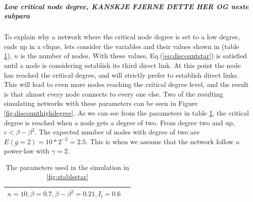 \subparagraph{Low critical node degree, KANSKJE FJERNE DETTE HER OG neste subpara}
To explain why a network where the critical node degree is set to a low degree, ends up in a clique, 
 lets consider the variables and their values shown in (table \ref{tbl:clique}), $n$ is the number of nodes. With these values, Eq.(\ref{eq:discountstar}) is satisfied until a node is considering establish its third direct link. At this point the node has reached the critical degree, and will strictly prefer to establish direct links. This will lead to even more nodes reaching the critical degree level, and the result is that almost every node connects to every one else. Two of the resulting simulating networks with these parameters can be seen in Figure \ref{fig:discounthighdegree}. As we can see from the parameters in table \ref{tbl:clique}, the critical degree is reached when a node gets a degree of two. From degree two and up, $c<\beta-\beta^{2}$. The expected number of nodes with degree of two are $E(g=2)=10*2^{-2}=2.5$. This is when we assume that the network follow a power-law with $\gamma=2$.
\begin{table}[h]
\centering
\begin{tabular}{lc}
 \hline
  $
  n=10,
  \beta=0.7,
  \beta-\beta^2=0.21,
  I_{l}=0.6$\\
  \hline
\end{tabular}
\caption{The parameters used in the simulation in \ref{fig:stablestar} \label{tbl:clique}}
\end{table}

